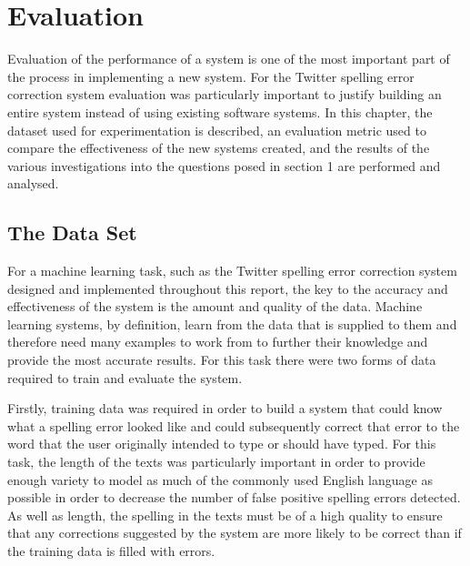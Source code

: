 \chapter{Evaluation}
Evaluation of the performance of a system is one of the most important part of the process in implementing a new system. For the Twitter spelling error correction system evaluation was particularly important to justify building an entire system instead of using existing software systems. In this chapter, the dataset used for experimentation is described, an evaluation metric used to compare the effectiveness of the new systems created, and the results of the various investigations into the questions posed in section 1 are performed and analysed.

\section{The Data Set}
For a machine learning task, such as the Twitter spelling error correction system designed and implemented throughout this report, the key to the accuracy and effectiveness of the system is the amount and quality of the data. Machine learning systems, by definition, learn from the data that is supplied to them and therefore need many examples to work from to further their knowledge and provide the most accurate results. For this task there were two forms of data required to train and evaluate the system.

Firstly, training data was required in order to build a system that could know what a spelling error looked like and could subsequently correct that error to the word that the user originally intended to type or should have typed. For this task, the length of the texts was particularly important in order to provide enough variety to model as much of the commonly used English language as possible in order to decrease the number of false positive spelling errors detected. As well as length, the spelling in the texts must be of a high quality to ensure that any corrections suggested by the system are more likely to be correct than if the training data is filled with errors. 

